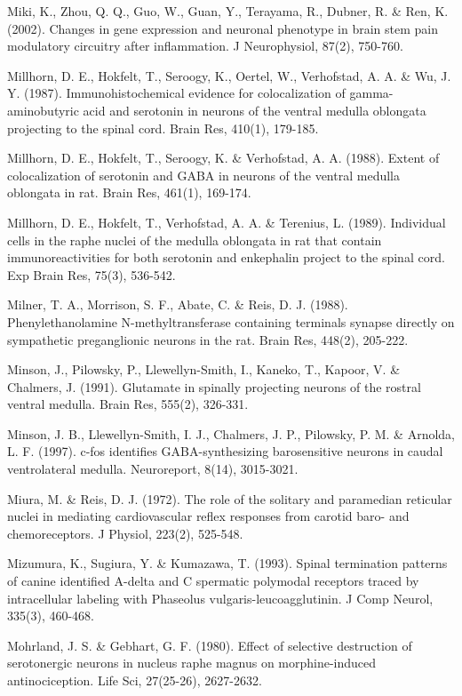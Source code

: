 \documentclass[a4paper,12pt,twoside]{report}
\begin{document}
\begin{singlespacing}
\begin{footnotesize}
Miki, K., Zhou, Q. Q., Guo, W., Guan, Y., Terayama, R., Dubner, R. \& Ren, K. (2002). Changes in gene expression and neuronal phenotype in brain stem pain modulatory circuitry after inflammation. J Neurophysiol, 87(2), 750-760.

Millhorn, D. E., Hokfelt, T., Seroogy, K., Oertel, W., Verhofstad, A. A. \& Wu, J. Y. (1987). Immunohistochemical evidence for colocalization of gamma-aminobutyric acid and serotonin in neurons of the ventral medulla oblongata projecting to the spinal cord. Brain Res, 410(1), 179-185.

Millhorn, D. E., Hokfelt, T., Seroogy, K. \& Verhofstad, A. A. (1988). Extent of colocalization of serotonin and GABA in neurons of the ventral medulla oblongata in rat. Brain Res, 461(1), 169-174.

Millhorn, D. E., Hokfelt, T., Verhofstad, A. A. \& Terenius, L. (1989). Individual cells in the raphe nuclei of the medulla oblongata in rat that contain immunoreactivities for both serotonin and enkephalin project to the spinal cord. Exp Brain Res, 75(3), 536-542.

Milner, T. A., Morrison, S. F., Abate, C. \& Reis, D. J. (1988). Phenylethanolamine N-methyltransferase containing terminals synapse directly on sympathetic preganglionic neurons in the rat. Brain Res, 448(2), 205-222.

Minson, J., Pilowsky, P., Llewellyn-Smith, I., Kaneko, T., Kapoor, V. \& Chalmers, J. (1991). Glutamate in spinally projecting neurons of the rostral ventral medulla. Brain Res, 555(2), 326-331.

Minson, J. B., Llewellyn-Smith, I. J., Chalmers, J. P., Pilowsky, P. M. \& Arnolda, L. F. (1997). c-fos identifies GABA-synthesizing barosensitive neurons in caudal ventrolateral medulla. Neuroreport, 8(14), 3015-3021.

Miura, M. \& Reis, D. J. (1972). The role of the solitary and paramedian reticular nuclei in mediating cardiovascular reflex responses from carotid baro- and chemoreceptors. J Physiol, 223(2), 525-548.

Mizumura, K., Sugiura, Y. \& Kumazawa, T. (1993). Spinal termination patterns of canine identified A-delta and C spermatic polymodal receptors traced by intracellular labeling with Phaseolus vulgaris-leucoagglutinin. J Comp Neurol, 335(3), 460-468.

Mohrland, J. S. \& Gebhart, G. F. (1980). Effect of selective destruction of serotonergic neurons in nucleus raphe magnus on morphine-induced antinociception. Life Sci, 27(25-26), 2627-2632.


\end{footnotesize}
\end{singlespacing}
\end{document}
